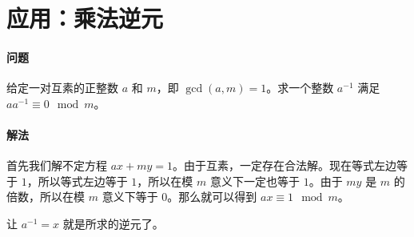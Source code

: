 \documentclass{article}
\begin{document}
\section{应用：乘法逆元}

\paragraph{问题}
给定一对互素的正整数 $a$ 和 $m$，即 $\gcd(a,m) = 1$。求一个整数 $a^{-1}$ 满足 $aa^{-1}\equiv 0 \mod m$。

\paragraph{解法}
首先我们解不定方程 $ax+my = 1$。由于互素，一定存在合法解。现在等式左边等于 $1$，所以等式左边等于 $1$，所以在模 $m$ 意义下一定也等于 $1$。由于 $my$ 是 $m$ 的倍数，所以在模 $m$ 意义下等于 $0$。那么就可以得到 $ax \equiv 1 \mod m$。

让 $a^{-1} = x$ 就是所求的逆元了。
\end{document}

